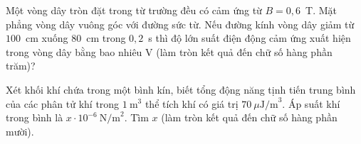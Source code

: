 	\begin{ex}%
		Một vòng dây tròn đặt trong từ trường đều có cảm ứng từ $B=0{,}6$~T. Mặt phẳng vòng dây vuông góc với đường sức từ. Nếu đường kính vòng dây giảm từ $100$~cm xuống $80$~cm trong $0{,}2$~s thì độ lớn suất điện động cảm ứng xuất hiện trong vòng dây bằng bao nhiêu V (làm tròn kết quả đến chữ số hàng phần trăm)?
		\par
	\end{ex}

	\begin{ex}%
		Xét khối khí chứa trong một bình kín, biết tổng động năng tịnh tiến trung bình của các phân tử khí trong $1~\text{m}^3$ thể tích khí có giá trị $70~\mu\text{J/m}^3$. Áp suất khí trong bình là $x\cdot 10^{-6}~\text{N/m}^2$. Tìm $x$ (làm tròn kết quả đến chữ số hàng phần mười).
		\par
	\end{ex}

